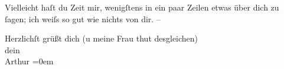 \pstart
           Vielleicht haſt du Zeit mir, wenigſtens in ein paar Zeilen etwas über dich zu{ }ſagen;
               ich weiſs so gut wie nichts von dir. –\pend
           
\pstart
           Herzlichſt grüßt dich (u meine Frau thut desgleichen){\\[\baselineskip]}dein{\\[\baselineskip]}\spacefill\mbox{Arthur}\pend
           \leftskip=0em{}\endnumbering{}  \newcommand{\dateiname}{L01743}\newcommand{\titel}{Arthur Schnitzler an Hermann Bahr, 20. 12. 1907}\newcommand{\editorInnen}{Herausgegeben von Martin Anton Müller}
